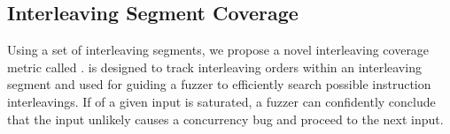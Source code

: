 % 



\subsection{Interleaving Segment Coverage}
\label{ss:coverage}



Using a set of interleaving segments, we propose a novel interleaving coverage metric called \textit{\intcov}.
\Intcov is designed to track interleaving orders
within an interleaving segment and used for guiding a fuzzer to  
efficiently search possible instruction interleavings.
If \intcov of a given input is saturated, 
a fuzzer can confidently conclude that the input unlikely causes a concurrency bug and proceed to the next input.



